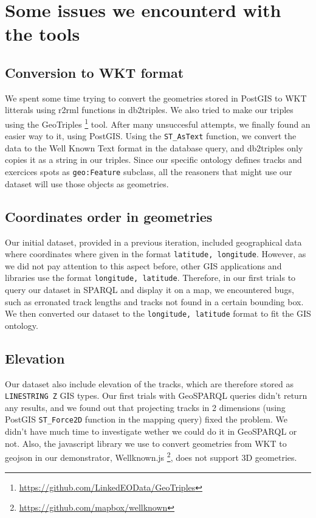 \documentclass[11pt,a4paper]{scrreprt}
\begin{document}
\section{Some issues we encounterd with the tools}
\subsection{Conversion to WKT format}
We spent some time trying to convert the geometries stored in PostGIS to WKT litterals using r2rml functions in db2triples. We also tried to make our triples using the GeoTriples \footnote{\url{https://github.com/LinkedEOData/GeoTriples}} tool. After many unsuccesful attempts, we finally found an easier way to it, using PostGIS. Using the \texttt{ST\_AsText} function, we convert the data to the Well Known Text format in the database query, and db2triples only copies it as a string in our triples. Since our specific ontology defines tracks and exercices spots as \texttt{geo:Feature} subclass, all the reasoners that might use our dataset will use those objects as geometries.

\subsection{Coordinates order in geometries}
Our initial dataset, provided in a previous iteration, included geographical data where coordinates where given in the format \texttt{latitude, longitude}. However, as we did not pay attention to this aspect before, other GIS applications and libraries use the format \texttt{longitude, latitude}. Therefore, in our first trials to query our dataset in SPARQL and display it on a map, we encountered bugs, such as erronated track lengths and tracks not found in a certain bounding box. We then converted our dataset to the \texttt{longitude, latitude} format to fit the GIS ontology.

\subsection{Elevation}
Our dataset also include elevation of the tracks, which are therefore stored as \texttt{LINESTRING Z} GIS types. Our first trials with GeoSPARQL queries didn't return any results, and we found out that projecting tracks in 2 dimensions (using PostGIS \texttt{ST\_Force2D} function in the mapping query) fixed the problem. We didn't have much time to investigate wether we could do it in GeoSPARQL or not. Also, the javascript library we use to convert geometries from WKT to geojson in our demonstrator, Wellknown.js \footnote{\url{https://github.com/mapbox/wellknown}}, does not support 3D geometries.
\end{document}
